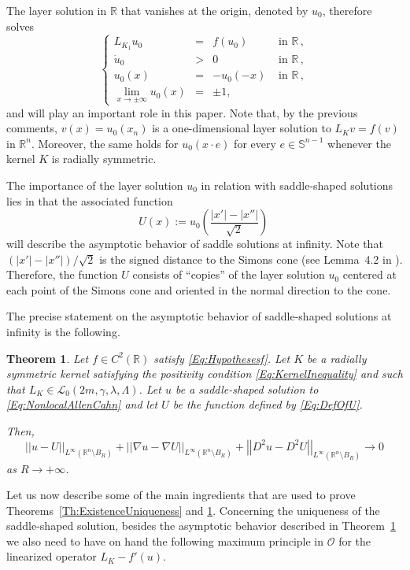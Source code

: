 \documentclass[12pt,reqno]{amsart}
\newtheorem{theorem}{Theorem}[section]
\theoremstyle{definition}
\theoremstyle{remark}
\newcommand{\con}[1]{\mathbb{#1}}
\newcommand{\R}{\con{R}} %
\newcommand{\Sph}{\con{S}} %
\newcommand{\lcal}{\mathcal{L}}
\newcommand{\ocal}{\mathcal{O}}
\newcommand{\norm}[1]{\left | \left |{#1} \right | \right |}
\newcommand{\s}{\gamma}
\newcommand\beqc[1]{\left\{\begin{array}{#1}}
\newcommand\eeqc{\end{array} \right.}
\def\PDEsystem{rcll}
\def\ds{\displaystyle}
\numberwithin{equation}{section}
\begin{document}
The layer solution in $\R$ that vanishes at the origin, denoted by $u_0$, therefore solves
\begin{equation}
\label{Eq:LayerSolution}
\beqc{\PDEsystem}
L_{K_1}  u_0 &=& f(u_0) & \textrm{ in }\R\,,\\
\dot{u}_0 &>& 0 & \textrm{ in } \R\,,\\
u_0(x) & = &-u_0(-x)  & \textrm{ in }\R\,,\\
\ds \lim_{x \to \pm \infty} u_0(x) &=& \pm 1, & 
\eeqc
\end{equation}
and will play an important role in this paper. Note that, by the previous comments, $v(x) = u_0(x_n)$ is a one-dimensional layer solution to $L_K v = f(v)$ in $\R^n$. Moreover, the same holds for $u_0(x\cdot e)$ for every $e\in \Sph^{n-1}$ whenever the kernel $K$ is radially symmetric.

The importance of the layer solution $u_0$ in relation with saddle-shaped solutions lies in that the associated function
\begin{equation}
\label{Eq:DefOfU}
U(x):= u_0 \left( \dfrac{|x'| - |x''|}{\sqrt{2}} \right)\,
\end{equation}
will describe the asymptotic behavior of saddle solutions at infinity. Note that $(|x'| - |x''| )/\sqrt{2}$ is the signed distance to the Simons cone (see Lemma~4.2 in \cite{CabreTerraII}). Therefore, the function $U$ consists of ``copies'' of the layer solution $u_0$ centered at each point of the Simons cone and oriented in the normal direction to the cone.

The precise statement on the asymptotic behavior of saddle-shaped solutions at infinity is the following.

\begin{theorem}
	\label{Th:AsymptoticBehaviorSaddleSolution}
	Let $f\in C^2(\R)$ satisfy \eqref{Eq:Hypothesesf}. Let $K$ be a radially symmetric kernel satisfying the positivity condition \eqref{Eq:KernelInequality} and such that $L_K\in \lcal_0(2m, \s, \lambda, \Lambda)$. Let $u$ be a saddle-shaped solution to \eqref{Eq:NonlocalAllenCahn} and let $U$ be the function defined by \eqref{Eq:DefOfU}.
	
	Then,
	$$
	\norm{u-U}_{L^\infty(\R^n\setminus B_R)}
	+\norm{\nabla u-\nabla U}_{L^\infty(\R^n\setminus B_R)}
	+\norm{D^2u-D^2U}_{L^\infty(\R^n\setminus B_R)} \to 0
	$$
	as $ R\to +\infty$.
\end{theorem}


Let us now describe some of the main ingredients that are used to prove Theorems~\ref{Th:ExistenceUniqueness} and \ref{Th:AsymptoticBehaviorSaddleSolution}. Concerning the uniqueness of the saddle-shaped solution, besides the asymptotic behavior described in Theorem~\ref{Th:AsymptoticBehaviorSaddleSolution} we also need to have on hand the following maximum principle in $\ocal$ for the linearized operator $L_K - f'(u)$.
\end{document}
